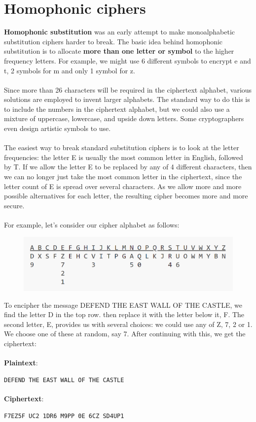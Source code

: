 \documentclass[Lau,binding=0.6cm,oneside]{sapthesis}
\begin{document}
\section{Homophonic ciphers}
\textbf{Homophonic substitution} was an early attempt to make monoalphabetic substitution ciphers harder to break. The basic idea behind homophonic substitution is to allocate \textbf{more than one letter or symbol} to the higher frequency letters\supercite{homophonic}. For example, we might use 6 different symbols to encrypt \textsf{e} and \textsf{t}, 2 symbols for \textsf{m} and only 1 symbol for \textsf{z}.\\\\
Since more than 26 characters will be required in the ciphertext alphabet, various solutions are employed to invent larger alphabets. The standard way to do this is to include the numbers in the ciphertext alphabet, but we could also use a mixture of uppercase, lowercase, and upside down letters. Some cryptographers even design artistic symbols to use.\\\\
The easiest way to break standard substitution ciphers is to look at the letter frequencies: the letter \textsf{E} is usually the most common letter in English, followed by \textsf{T}. If we allow the letter \textsf{E} to be replaced by any of 4 different characters, then we can no longer just take the most common letter in the ciphertext, since the letter count of \textsf{E} is spread over several characters. As we allow more and more possible alternatives for each letter, the resulting cipher becomes more and more secure.\\\\
For example, let's consider our cipher alphabet as follows:

\begin{figure}[H]
\includegraphics[scale=0.4]{homophonic_cipher}
\centering
\caption{}
\centering
\end{figure}

To encipher the message \textsf{DEFEND THE EAST WALL OF THE CASTLE}, we find the letter \textsf{D} in the top row. then replace it with the letter below it, \textsf{F}. The second letter, \textsf{E}, provides us with several choices: we could use any of \textsf{Z}, \textsf{7}, \textsf{2} or \textsf{1}. We choose one of these at random, say \textsf{7}. After continuing with this, we get the ciphertext:\\
\ \\
\textbf{Plaintext}: \par\colorbox{gray!12}{\small{\texttt{DEFEND THE EAST WALL OF THE CASTLE}}}\\\\
\textbf{Ciphertext}: \par\colorbox{gray!12}{\small{\texttt{F7EZ5F UC2 1DR6 M9PP 0E 6CZ SD4UP1}}}\\
\end{document}
